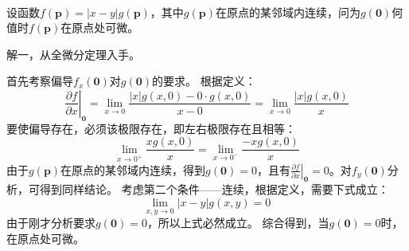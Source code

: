 ~

\begin{example}
设函数$f\left( \boldsymbol{p} \right) =\left| x-y \right|g\left( \boldsymbol{p} \right) $，其中$g\left( \boldsymbol{p} \right) $在原点的某邻域内连续，问为$g\left( \mathbf{0} \right) $何值时$f\left( \boldsymbol{p} \right) $在原点处可微。
\end{example}

解一，从全微分定理入手。

首先考察偏导$f_x\left( \mathbf{0} \right) $对$g\left( \mathbf{0} \right) $的要求。
根据定义：
\[
\left. \frac{\partial f}{\partial x} \right|_{\mathbf{0}}=\underset{x\rightarrow 0}{\lim}\frac{\left| x \right|g\left( x,0 \right) -0\cdot g\left( x,0 \right)}{x-0}=\underset{x\rightarrow 0}{\lim}\frac{\left| x \right|g\left( x,0 \right)}{x}
\]
要使偏导存在，必须该极限存在，即左右极限存在且相等：
\[
\underset{x\rightarrow 0^+}{\lim}\frac{xg\left( x,0 \right)}{x}=\underset{x\rightarrow 0^-}{\lim}\frac{-xg\left( x,0 \right)}{x}
\]
由于$g\left( \boldsymbol{p} \right) $在原点的某邻域内连续，得到$g\left( \mathbf{0} \right) =0$，且有$\left. \frac{\partial f}{\partial x} \right|_{\mathbf{0}}=0$。对$f_y\left( \mathbf{0} \right) $分析，可得到同样结论。
考虑第二个条件——连续，根据定义，需要下式成立：
\[
\underset{x,y\rightarrow 0}{\lim}\left| x-y \right|g\left( x,y \right) =0
\]
由于刚才分析要求$g\left( \mathbf{0} \right) =0$，所以上式必然成立。
综合得到，当$g\left( \mathbf{0} \right) =0$时， 在原点处可微。

